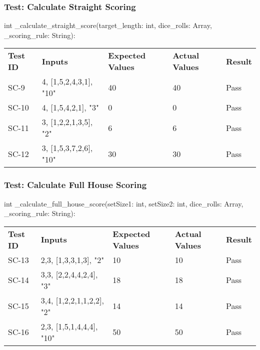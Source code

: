 \documentclass[12pt, titlepage]{article}
\begin{document}
\subsubsection{Test: Calculate Straight Scoring}
int \_calculate\_straight\_score(target\_length: int, dice\_rolls: Array, \_scoring\_rule: String):\\
\begin{tabularx}{\textwidth}{|p{2cm}|p{3.0cm}|p{4cm}|p{3.0cm}|p{1.5cm}|}
    \cline{1-5}
    \textbf{Test ID} & \textbf{Inputs} & \textbf{Expected Values} & \textbf{Actual Values} & \textbf{Result} \\
    \cline{1-5}
    SC-9 & 4, [1,5,2,4,3,1], "10" & 40 & 40 & Pass \\
    \cline{1-5}
    SC-10 & 4, [1,5,4,2,1], "3" & 0 & 0 & Pass \\
    \cline{1-5}
    SC-11 & 3, [1,2,2,1,3,5], "2" & 6 & 6 & Pass \\
    \cline{1-5}
    SC-12 & 3, [1,5,3,7,2,6], "10" & 30 & 30 & Pass \\
    \cline{1-5}
\end{tabularx}

\subsubsection{Test: Calculate Full House Scoring}
int \_calculate\_full\_house\_score(setSize1: int, setSize2: int, dice\_rolls: Array, \_scoring\_rule: String):\\
\begin{tabularx}{\textwidth}{|p{2cm}|p{3.5cm}|p{3.5cm}|p{3.0cm}|p{1.5cm}|}
    \cline{1-5}
    \textbf{Test ID} & \textbf{Inputs} & \textbf{Expected Values} & \textbf{Actual Values} & \textbf{Result} \\
    \cline{1-5}
    SC-13 & 2,3, [1,3,3,1,3], "2" & 10 & 10 & Pass \\
    \cline{1-5}
    SC-14 & 3,3, [2,2,4,4,2,4], "3" & 18 & 18 & Pass \\
    \cline{1-5}
    SC-15 & 3,4, [1,2,2,1,1,2,2], "2" & 14 & 14 & Pass \\
    \cline{1-5}
    SC-16 & 2,3, [1,5,1,4,4,4], "10" & 50 & 50 & Pass \\
    \cline{1-5}
\end{tabularx}
\end{document}
